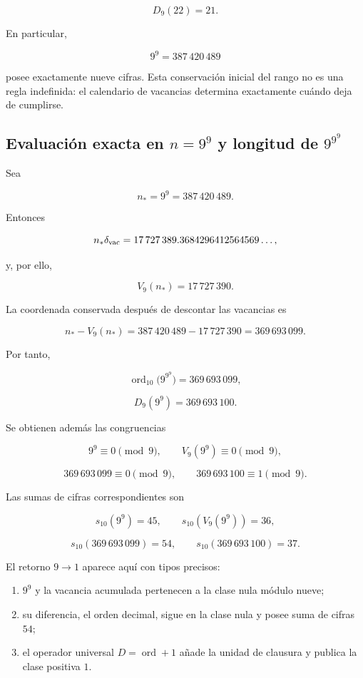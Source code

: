 \[
D_9(22)=21.
\]

En particular,

\[
9^9=387\,420\,489
\]

posee exactamente nueve cifras. Esta conservación inicial del rango no es una regla indefinida: el calendario de vacancias determina exactamente cuándo deja de cumplirse.

\subsection{Evaluación exacta en \(n=9^9\) y longitud de \(9^{9^9}\)}

Sea

\[
n_*=9^9=387\,420\,489.
\]

Entonces

\[
n_*\delta_{\rm vac}
=17\,727\,389.3684296412564569\ldots,
\]

y, por ello,

\[
\boxed{V_9(n_*)=17\,727\,390}.
\]

La coordenada conservada después de descontar las vacancias es

\[
n_*-V_9(n_*)
=387\,420\,489-17\,727\,390
=369\,693\,099.
\]

Por tanto,

\[
\boxed{\operatorname{ord}_{10}\bigl(9^{9^9}\bigr)=369\,693\,099},
\]

\[
\boxed{D_9(9^9)=369\,693\,100}.
\]

Se obtienen además las congruencias

\[
9^9\equiv0\pmod9,\qquad
V_9(9^9)\equiv0\pmod9,
\]

\[
369\,693\,099\equiv0\pmod9,\qquad
369\,693\,100\equiv1\pmod9.
\]

Las sumas de cifras correspondientes son

\[
s_{10}(9^9)=45,\qquad
s_{10}(V_9(9^9))=36,
\]

\[
s_{10}(369\,693\,099)=54,\qquad
s_{10}(369\,693\,100)=37.
\]

El retorno \(9\to1\) aparece aquí con tipos precisos:

\begin{enumerate}
\item \(9^9\) y la vacancia acumulada pertenecen a la clase nula módulo nueve;
\item su diferencia, el orden decimal, sigue en la clase nula y posee suma de cifras \(54\);
\item el operador universal \(D=\operatorname{ord}+1\) añade la unidad de clausura y publica la clase positiva \(1\).
\end{enumerate}

